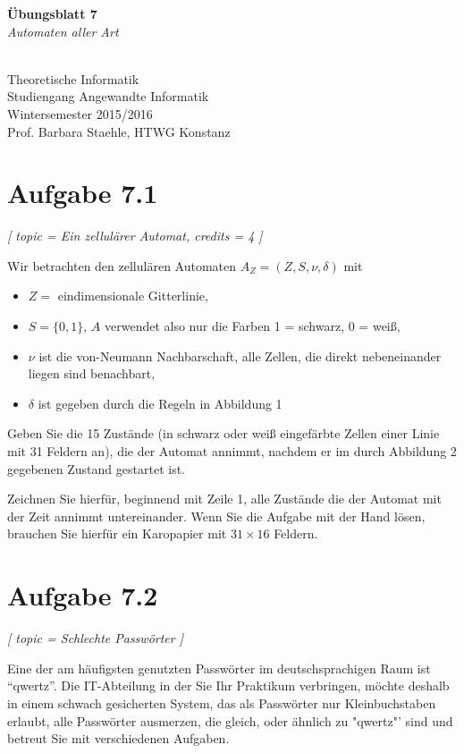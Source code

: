 \documentclass[12pt]{article}
\begin{document}
  
\begin{center}
\begin{huge}
\textbf{Übungsblatt 7}\\
\textit{Automaten aller Art}
\end{huge} \\

Theoretische Informatik\\
Studiengang Angewandte Informatik\\
Wintersemester 2015/2016\\
Prof. Barbara Staehle, HTWG Konstanz
\end{center}

\section*{Aufgabe 7.1}
\textit{[ 
 topic = Ein zellulärer Automat, 
 credits = 4 
 ] }
  
  
 Wir betrachten den zellulären Automaten $A_Z = (Z,S,\nu, \delta)$ mit 
 \begin{itemize} 
 \item $Z = $ eindimensionale Gitterlinie, 
 \item $S = \{0,1\}$, $A$ verwendet also nur die Farben 1 = schwarz, 0 = weiß,  
 \item $\nu$ ist die von-Neumann Nachbarschaft, alle Zellen, die direkt nebeneinander liegen sind benachbart,  
 \item $\delta$ ist gegeben durch die Regeln in Abbildung 1
 \end{itemize} 
  

  
 Geben Sie die 15 Zustände (in schwarz oder weiß eingefärbte Zellen einer Linie mit 31 Feldern an), die der Automat annimmt, nachdem er im durch Abbildung 2 gegebenen Zustand gestartet ist.  
  
 Zeichnen Sie hierfür, beginnend mit Zeile 1, alle Zustände die der Automat mit der Zeit annimmt untereinander. Wenn Sie die Aufgabe mit der Hand lösen, brauchen Sie hierfür ein Karopapier mit $31 \times 16$ Feldern.  
  

  
\section*{Aufgabe 7.2} 
\textit{[
 topic = Schlechte Passwörter 
 ] }
  
 Eine der am häufigsten genutzten Passwörter im deutschsprachigen Raum ist "`qwertz"'. Die IT-Abteilung in der Sie Ihr Praktikum verbringen, möchte deshalb in einem schwach gesicherten System, das als Passwörter nur Kleinbuchstaben erlaubt, alle Passwörter ausmerzen, die gleich, oder ähnlich zu "qwertz"' sind und betreut Sie mit verschiedenen Aufgaben. 
  
\end{document}

